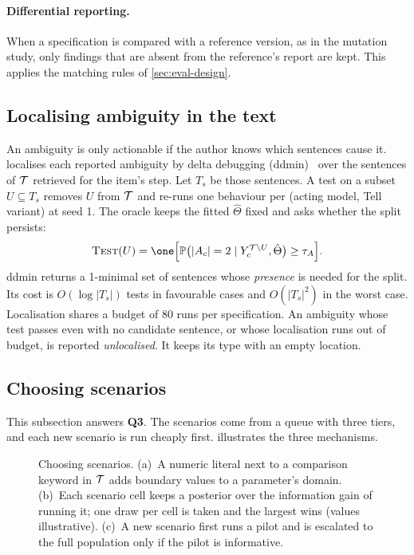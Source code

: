 \paragraph{Differential reporting.} When a specification is compared with a reference version, as in the mutation study, only findings that are absent from the reference's report are kept. This applies the matching rules of \cref{sec:eval-design}.

\subsection{Localising ambiguity in the text}
\label{sec:approach-localise}

An ambiguity is only actionable if the author knows which sentences cause it. \specdx localises each reported ambiguity by delta debugging (ddmin)~\cite{zeller2002simplifying} over the sentences of $\mathcal{T}$ retrieved for the item's step. Let $T_s$ be those sentences. A test on a subset $U\subseteq T_s$ removes $U$ from $\mathcal{T}$ and re-runs one behaviour per (acting model, Tell variant) at seed 1. The oracle keeps the fitted $\hat\Theta$ fixed and asks whether the split persists:
\begin{equation}
\label{eq:ddmin-oracle}
\textsc{Test}(U)=\one\Bigl[\Prob\bigl(|A_c|=2\mid Y_c^{\Tell\setminus U},\hat\Theta\bigr)\ge\tau_A\Bigr].
\end{equation}
ddmin returns a 1-minimal set of sentences whose \emph{presence} is needed for the split. Its cost is $O(\log|T_s|)$ tests in favourable cases and $O(|T_s|^2)$ in the worst case. Localisation shares a budget of 80 runs per specification. An ambiguity whose test passes even with no candidate sentence, or whose localisation runs out of budget, is reported \emph{unlocalised}. It keeps its type with an empty location.

\subsection{Choosing scenarios}
\label{sec:approach-scenarios}

This subsection answers \textbf{Q3}. The scenarios come from a queue with three tiers, and each new scenario is run cheaply first.  illustrates the three mechanisms.

\begin{figure}[t]
\centering
\resizebox{\textwidth}{!}{}
\caption{Choosing scenarios. (a)~A numeric literal next to a comparison keyword in $\mathcal{T}$ adds boundary values to a parameter's domain. (b)~Each scenario cell keeps a posterior over the information gain of running it; one draw per cell is taken and the largest wins (values illustrative). (c)~A new scenario first runs a pilot and is escalated to the full population only if the pilot is informative.}
\label{fig:scenarios}
\end{figure}

